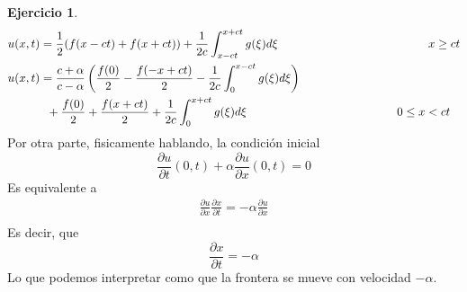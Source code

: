 \documentclass{article}
\theoremstyle{plain}
\theoremstyle{definition}
\newtheorem{ex}[proposición]{Ejercicio}
\begin{document}
\begin{ex}
\begin{align*}
    u(x,t) &= \frac{1}{2}(f(x - ct) + f(x + ct)) + \frac{1}{2c} \int_{x - ct}^{x + ct} g(\xi) d\xi \hspace{45mm}  x \geq ct\\
    u(x,t)&=\frac{c +\alpha}{c - \alpha }\left(\frac{f(0)}{2} - \frac{f(-x+ct)}{2} - \frac{1}{2c} \int_{0}^{x-ct} g(\xi) d\xi\right)\\
    &\hspace{2mm} + \frac{f(0)}{2} + \frac{f(x+ct)}{2} + \frac{1}{2c} \int_{0}^{x+ct} g(\xi) d\xi \hspace{45mm}  0 \leq x < ct\\
\end{align*}
Por otra parte, fisicamente hablando, la condición inicial
\[
    \frac{\partial u}{\partial t}(0,t) + \alpha \frac{\partial u}{\partial x}(0,t) = 0 
\]
Es equivalente a
\begin{align*}
    \frac{\partial u}{\partial x}\frac{\partial x}{\partial t} = -\alpha \frac{\partial u}{\partial x}\\
\end{align*}
Es decir, que
\[
    \frac{\partial x}{\partial t} = -\alpha
\]
Lo que podemos interpretar como que la frontera se mueve con velocidad $-\alpha$.


\end{ex}
\end{document}
